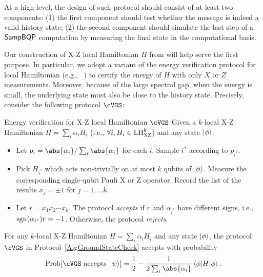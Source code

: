 At a high-level, the design of such protocol should consist of at least two components: (1) the first component should test whether the message is indeed a valid history state; (2) the second component should simulate the last step of a $\operatorname{\mathsf{SampBQP}}$ computation by measuring the final state in the computational basis. 

Our construction of X-Z local Hamiltonian $H$ from  will help serve the first purpose. 
In particular, we adopt a variant of the energy verification protocol for local Hamiltonian (e.g., ~\cite{mf16, PhysRevA.93.022326}) to certify the energy of $H$ with only $X$ or $Z$ measurements.
Moreover, because of the large spectral gap, when the energy is small, the underlying state must also be close to the history state. 
Precisely, consider the following protocol $\cVGS$: 

\begin{protocol}{Energy verification for X-Z local Hamiltonian $\cVGS$} \label{AlgGroundStateCheck}
Given a $k$-local X-Z Hamiltonian 
$H=\sum_i \alpha_{i} H_i$ (i.e., $\forall i, H_i \in \mathrm{LH}_{\mathrm{XZ}}^{k}$) and any state $\ket{\phi}$.

\begin{itemize}
\item Let $p_i= \abs{\alpha_i}/\sum_i \abs{\alpha_i}$ for each $i$. Sample $i^*$ according to $p_{i^*}$. 
\item Pick $H_{i^*}$ which acts non-trivially on at most $k$ qubits of $\ket{\phi}$. Measure the corresponding single-qubit Pauli X or Z operator. 
Record the list of the results $x_j=\pm 1$ for $j=1, \ldots k$. 
\item Let $r=x_1x_2\cdots x_k$. The protocol \emph{accepts} if $r$ and $\alpha_{i^*}$ have different signs, i.e., $\operatorname{sgn}(\alpha_{i^*})r=-1$. Otherwise, the protocol \emph{rejects}. 
\end{itemize}
\end{protocol}

\begin{lem}
	\label{thm:HamCheck}
	For any $k$-local X-Z Hamiltonian $H=\sum_i \alpha_{i} H_i$ and any state $\ket{\phi}$, 
	the protocol $\cVGS$ in Protocol~\ref{AlgGroundStateCheck} accepts with 
	probability
\begin{equation}
 \mathrm{Prob}[ \cVGS \text{ accepts } \ket{\psi}] = \frac{1}{2} - \frac{1}{2 \sum_i \abs{\alpha_i}}\braket{\phi|H|\phi}.
\end{equation}
\end{lem}

